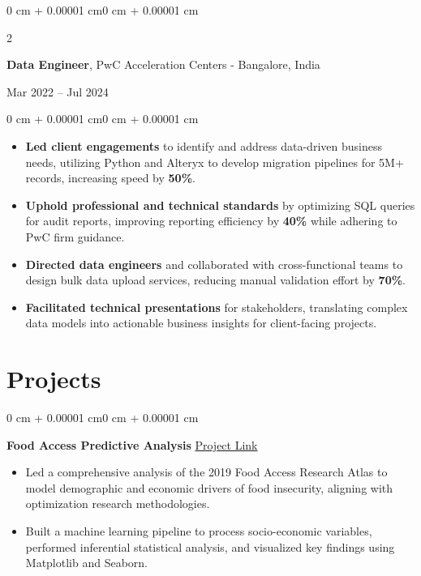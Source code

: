 \documentclass[letterpaper]{article}
\newcommand{\hrefWithoutArrow}[2]{\href{#1}{#2}}
\newenvironment{highlights}{
    \begin{itemize}[
        topsep=0pt,
        parsep=0.02 cm,
        partopsep=0pt,
        itemsep=2pt,
        leftmargin=10pt
    ]
}{
    \end{itemize}
}
\newenvironment{onecolentry}{
    \begin{adjustwidth}{0 cm + 0.00001 cm}{0 cm + 0.00001 cm}
}{
    \end{adjustwidth}
}
\newenvironment{twocolentry}[2][]{
    \onecolentry
    \def\secondColumn{#2}
    \setcolumnwidth{\fill, 4.5 cm}
    \begin{paracol}{2}
}{
    \switchcolumn \raggedleft \secondColumn
    \end{paracol} 
    \endonecolentry
}
\begin{document}
\vspace{0.2cm}

\begin{twocolentry}{Mar 2022 -- Jul 2024}
    \textbf{Data Engineer}, PwC Acceleration Centers - Bangalore, India
\end{twocolentry}
\vspace{0.1cm}
\begin{onecolentry}
    \begin{highlights}
        \item \textbf{Led client engagements} to identify and address data-driven business needs, utilizing Python and Alteryx to develop migration pipelines for 5M+ records, increasing speed by \textbf{50\%}.
        \item \textbf{Uphold professional and technical standards} by optimizing SQL queries for audit reports, improving reporting efficiency by \textbf{40\%} while adhering to PwC firm guidance.
        \item \textbf{Directed data engineers} and collaborated with cross-functional teams to design bulk data upload services, reducing manual validation effort by \textbf{70\%}.
        \item \textbf{Facilitated technical presentations} for stakeholders, translating complex data models into actionable business insights for client-facing projects.
    \end{highlights}
\end{onecolentry}

\section{Projects}

    \begin{onecolentry}
        \textbf{Food Access Predictive Analysis} \hfill \hrefWithoutArrow{https://github.com/JvkChaitanya/SNAP_Analysis}{Project Link}
        \begin{highlights}
            \item Led a comprehensive analysis of the 2019 Food Access Research Atlas to model demographic and economic drivers of food insecurity, aligning with optimization research methodologies.
            \item Built a machine learning pipeline to process socio-economic variables, performed inferential statistical analysis, and visualized key findings using Matplotlib and Seaborn.
        \end{highlights}
    \end{onecolentry}
    \vspace{0.05 cm}
\end{document}
